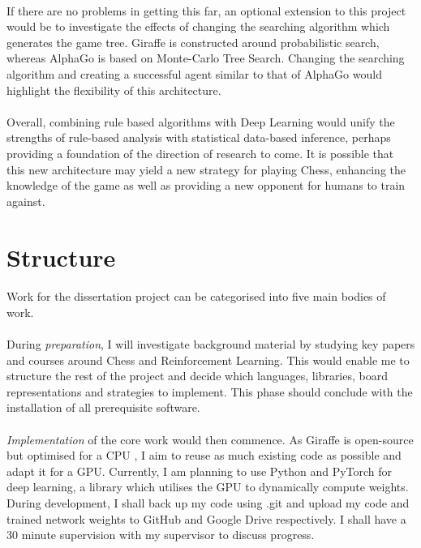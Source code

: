 \documentclass[a4paper]{article}
\begin{document}
\paragraph{}If there are no problems in getting this far, an optional extension to this project would be to investigate the effects of changing the searching algorithm which generates the game tree. Giraffe is constructed around probabilistic search, whereas AlphaGo is based on Monte-Carlo Tree Search. \cite{giraffe} \cite{AlphaGo} Changing the searching algorithm and creating a successful agent similar to that of AlphaGo would highlight the flexibility of this architecture.

\paragraph{}Overall, combining rule based algorithms with Deep Learning would unify the strengths of rule-based analysis with statistical data-based inference, perhaps providing a foundation of the direction of research to come. It is possible that this new architecture may yield a new strategy for playing Chess, enhancing the knowledge of the game as well as providing a new opponent for humans to train against.


\section*{Structure}

\paragraph{}Work for the dissertation project can be categorised into five main bodies of work.

\paragraph{}During \textit{preparation}, I will investigate background material by studying key papers and courses around Chess and Reinforcement Learning. \cite{giraffe} \cite{AlphaGo} \cite{TD-Gammon} \cite{knightcap} This would enable me to structure the rest of the project and decide which languages, libraries, board representations and strategies to implement. This phase should conclude with the installation of all prerequisite software.

\paragraph{}\textit{Implementation} of the core work would then commence. As Giraffe is open-source but optimised for a CPU \cite{giraffe}, I aim to reuse as much existing code as possible and adapt it for a GPU. Currently, I am planning to use Python and PyTorch for deep learning, a library which utilises the GPU to dynamically compute weights. \cite{PyTorch} During development, I shall back up my code using .git and upload my code and trained network weights to GitHub and Google Drive respectively. I shall have a 30 minute supervision with my supervisor to discuss progress.
\end{document}

